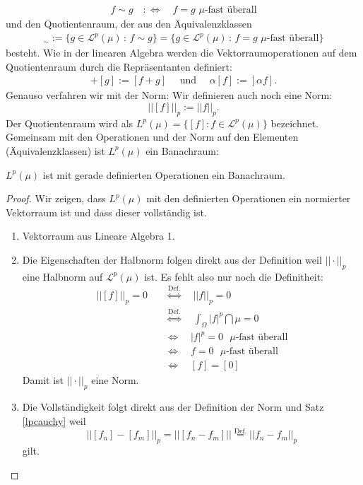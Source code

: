 \begin{align*}
f \sim g \quad :\Leftrightarrow\quad f = g \,\,\mu\text{-fast überall}
\end{align*}
und den Quotientenraum, der aus den \"Aquivalenzklassen 
\begin{align*}
[f]_\sim:=\{g\in \mathcal L^p(\mu)\,:\, f\sim g\}=\{g\in \mathcal L^p(\mu)\,:\, f=g\,\,\mu\text{-fast \"uberall} \}
\end{align*}
besteht. Wie in der linearen Algebra werden die Vektorraumoperationen auf dem Quotientenraum durch die Repr\"asentanten definiert:
\begin{align*}
[f]+[g]:=[f+g]\quad \text{ und }\quad \alpha [f]:=[\alpha f].
\end{align*}
Genauso verfahren wir mit der Norm: Wir definieren auch noch eine Norm: $$||[f]||_p:=||f||_p.$$ Der Quotientenraum wird als  $L^p(\mu)=\{[f]: f\in \mathcal L^p(\mu)\}$ bezeichnet. Gemeinsam mit den Operationen und der Norm auf den Elementen (\"Aquivalenzklassen) ist $L^p(\mu)$ ein Banachraum:
\begin{satz}
	$L^p(\mu)$ ist mit gerade definierten Operationen ein Banachraum.
\end{satz}

\begin{proof}
	Wir zeigen, dass $L^p(\mu)$ mit den definierten Operationen ein normierter Vektorraum ist und dass dieser vollst\"andig ist.
	\begin{enumerate}[label=(\alph*)]
		\item Vektorraum aus Lineare Algebra 1.
		\item Die Eigenschaften der Halbnorm folgen direkt aus der Definition weil $||\cdot||_p$ eine Halbnorm auf $\mathcal L^p(\mu)$ ist. Es fehlt also nur noch die Definitheit:
		\begin{align*}
		|| [f] ||_p = 0 \quad &\overset{\text{Def.}}{\Leftrightarrow} \quad ||f||_p = 0\\
		& \overset{\text{Def.}}{\Leftrightarrow}\quad \int_{\Omega} |f|^p \dint \mu = 0\\
		& \Leftrightarrow\quad |f|^p = 0 \text{ $\mu$-fast überall}\\
		& \Leftrightarrow \quad f = 0 \text{ $\mu$-fast überall}\\
		& \Leftrightarrow\quad [f] = [0]
		\end{align*}
		Damit ist $ ||\cdot ||_p $ eine Norm.
		\item Die Vollständigkeit folgt direkt aus der Definition der Norm und Satz  \ref{lpcauchy} weil $$ || [f_n] - [f_m] ||_p=||[f_n-f_m]|| \overset{\text{Def.}}{=} || f_n - f_m ||_p$$ gilt.
	\end{enumerate}
\end{proof}